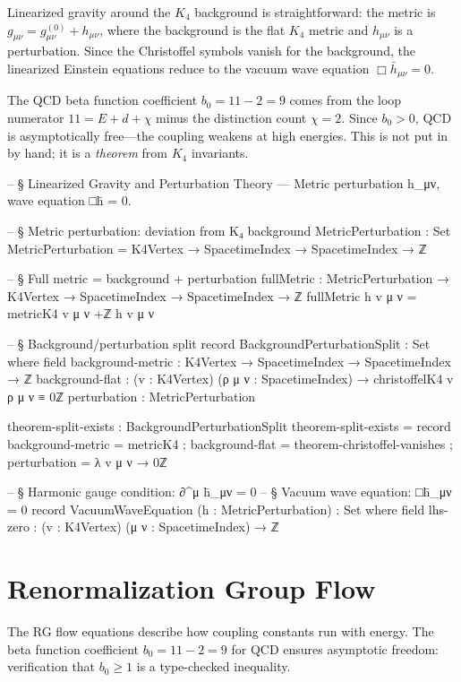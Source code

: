 \documentclass[11pt,a4paper]{book}
\begin{document}
Linearized gravity around the $K_4$ background is straightforward: the metric is $g_{\mu\nu} = g^{(0)}_{\mu\nu} + h_{\mu\nu}$, where the background is the flat $K_4$ metric and $h_{\mu\nu}$ is a perturbation. Since the Christoffel symbols vanish for the background, the linearized Einstein equations reduce to the vacuum wave equation $\Box \bar{h}_{\mu\nu} = 0$.

The QCD beta function coefficient $b_0 = 11 - 2 = 9$ comes from the loop numerator $11 = E + d + \chi$ minus the distinction count $\chi = 2$. Since $b_0 > 0$, QCD is asymptotically free---the coupling weakens at high energies. This is not put in by hand; it is a \emph{theorem} from $K_4$ invariants.

\begin{code}
-- § Linearized Gravity and Perturbation Theory — Metric perturbation h_μν, wave equation □h̄ = 0.

-- § Metric perturbation: deviation from K₄ background
MetricPerturbation : Set
MetricPerturbation = K4Vertex → SpacetimeIndex → SpacetimeIndex → ℤ

-- § Full metric = background + perturbation
fullMetric : MetricPerturbation → K4Vertex → SpacetimeIndex → SpacetimeIndex → ℤ
fullMetric h v μ ν = metricK4 v μ ν +ℤ h v μ ν

-- § Background/perturbation split
record BackgroundPerturbationSplit : Set where
  field
    background-metric : K4Vertex → SpacetimeIndex → SpacetimeIndex → ℤ
    background-flat   : (v : K4Vertex) (ρ μ ν : SpacetimeIndex) →
                        christoffelK4 v ρ μ ν ≡ 0ℤ
    perturbation      : MetricPerturbation

theorem-split-exists : BackgroundPerturbationSplit
theorem-split-exists = record
  { background-metric = metricK4
  ; background-flat   = theorem-christoffel-vanishes
  ; perturbation      = λ v μ ν → 0ℤ }

-- § Harmonic gauge condition: ∂^μ h̄_μν = 0
-- § Vacuum wave equation: □h̄_μν = 0
record VacuumWaveEquation (h : MetricPerturbation) : Set where
  field
    lhs-zero : (v : K4Vertex) (μ ν : SpacetimeIndex) → ℤ
\end{code}

\section{Renormalization Group Flow}
\label{sec:rg-flow}

The RG flow equations describe how coupling constants run with energy. The beta function coefficient $b_0 = 11 - 2 = 9$ for QCD ensures asymptotic freedom: verification that $b_0 \geq 1$ is a type-checked inequality.
\end{document}
